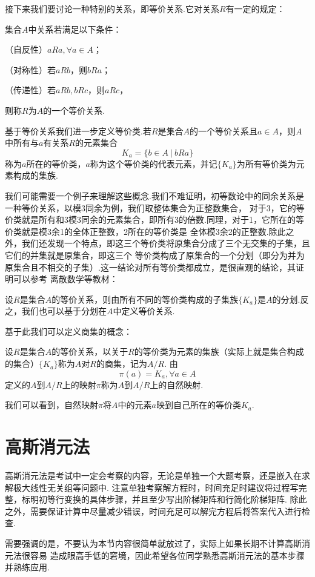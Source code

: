 接下来我们要讨论一种特别的关系，即等价关系.它对关系$R$有一定的规定：
\begin{definition}
	集合$A$中关系若满足以下条件：

	（自反性）$aRa,\forall a\in A$；

	（对称性）若$aRb$，则$bRa$；

	（传递性）若$aRb,bRc$，则$aRc$，

	则称$R$为$A$的一个等价关系.
\end{definition}
基于等价关系我们进一步定义等价类.若$R$是集合$A$的一个等价关系且$a\in A$，则$A$中所有与$a$有关系$R$的元素集合
$$K_a=\{b\in A\ |\ bRa\}$$称为$a$所在的等价类，$a$称为这个等价类的代表元素，并记$\{K_a\}$为所有等价类为元素构成的集族.

我们可能需要一个例子来理解这些概念.我们不难证明，初等数论中的同余关系是一种等价关系，以模3同余为例，我们取整体集合为正整数集合，
对于3，它的等价类就是所有和3模3同余的元素集合，即所有3的倍数.同理，对于1，它所在的等价类就是模3余1的全体正整数，2所在的等价类是
全体模3余2的正整数.除此之外，我们还发现一个特点，即这三个等价类将原集合分成了三个无交集的子集，且它们的并集就是原集合，即这三个
等价类构成了原集合的一个\textup{分划}（即分为并为原集合且不相交的子集）.这一结论对所有等价类都成立，是很直观的结论，其证明可以参考
离散数学等教材：
\begin{theorem}
	设$R$是集合$A$的等价关系，则由所有不同的等价类构成的子集族$\{K_a\}$是$A$的分划.反之，我们也可以基于分划在$A$中定义等价关系.
\end{theorem}
基于此我们可以定义\textup{商集}的概念：
\begin{definition}
	设$R$是集合$A$的等价关系，以关于$R$的等价类为元素的集族（实际上就是集合构成的集合）$\{K_a\}$称为$A$对$R$的商集，记为$A/R$.
	由$$\pi(a)=K_a,\forall a\in A$$定义的$A$到$A/R$上的映射$\pi$称为$A$到$A/R$上的自然映射.
\end{definition}
我们可以看到，自然映射$\pi$将$A$中的元素$a$映到自己所在的等价类$K_a$.

\section{高斯消元法}
高斯消元法是考试中一定会考察的内容，无论是单独一个大题考察，还是嵌入在求解极大线性无关组等问题中.
注意单独考察解方程时，时间充足时建议将过程写完整，标明初等行变换的具体步骤，并且至少写出阶梯矩阵和行简化阶梯矩阵.
除此之外，需要保证计算中尽量减少错误，时间充足可以解完方程后将答案代入进行检查.

需要强调的是，不要认为本节内容很简单就放过了，实际上如果长期不计算高斯消元法很容易
造成眼高手低的窘境，因此希望各位同学熟悉高斯消元法的基本步骤并熟练应用.
